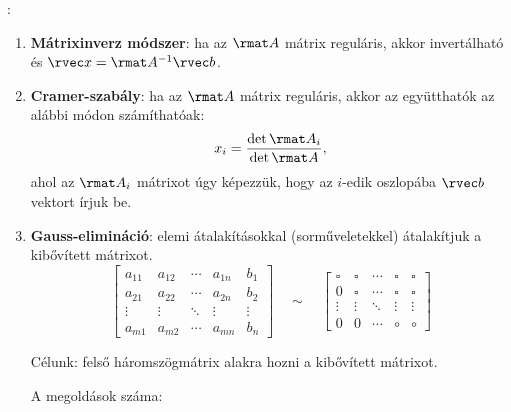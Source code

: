 \documentclass[a4paper, 12pt]{scrartcl}
\begin{document}
\begin{blueBox}
  :

  \begin{enumerate}
    \item \textbf{Mátrixinverz módszer}: ha az $\rmat A$ mátrix reguláris, akkor
          invertálható és $\rvec x = \rmat A^{-1} \rvec b$.

    \item \textbf{Cramer-szabály}: ha az $\rmat A$ mátrix reguláris, akkor az
          együtthatók az alábbi módon számíthatóak:
          $$
            x_i = \frac{\det \rmat A_i}{\det \rmat A}
            \text,
          $$
          ahol az $\rmat A_i$ mátrixot úgy képezzük, hogy az $i$-edik oszlopába
          $\rvec b$ vektort írjuk be.

    \item \textbf{Gauss-elimináció}: elemi átalakításokkal (sorműveletekkel)
          átalakítjuk a kibővített mátrixot.
          $$
            \left[\begin{array}{cccc|c}
                a_{11} & a_{12} & \cdots & a_{1n} & b_1    \\
                a_{21} & a_{22} & \cdots & a_{2n} & b_2    \\
                \vdots & \vdots & \ddots & \vdots & \vdots \\
                a_{m1} & a_{m2} & \cdots & a_{mn} & b_n
              \end{array}\right]
            \quad\sim\quad
            \left[\begin{array}{cccc|c}
                \square & \square & \cdots & \square & \square \\
                0       & \square & \cdots & \square & \square \\
                \vdots  & \vdots  & \ddots & \vdots  & \vdots  \\
                0       & 0       & \cdots & \circ   & \circ
              \end{array}\right]
          $$

          Célunk: felső háromszögmátrix alakra hozni a kibővített mátrixot.

          A megoldások száma:
          \begin{center}
\end{center}
\end{enumerate}
\end{blueBox}
\end{document}
